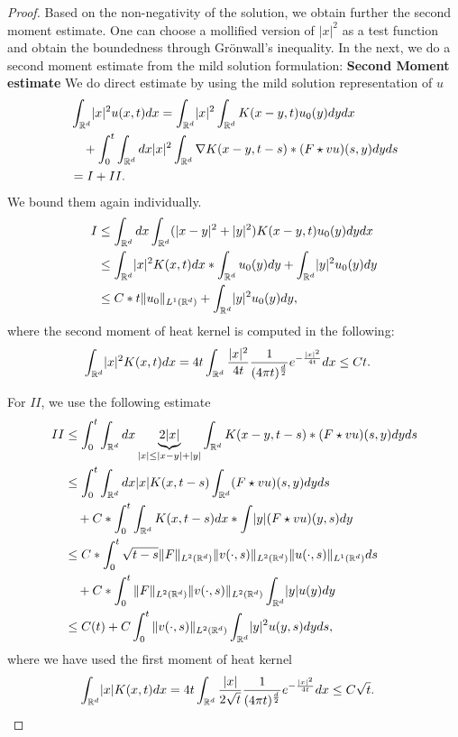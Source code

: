 \begin{proof}
\vskip3mm
Based on the non-negativity of the solution, we obtain further the second moment estimate. One can choose a mollified version of $|x|^2$ as a test function and obtain the boundedness through Grönwall's inequality. In the next, we do a second moment estimate from the mild solution formulation:
{\bf Second Moment estimate}
   We do direct estimate by using the mild solution representation of $u$
   \begin{align*}
   &     \int_{\mathbb{R}^{d} } \lvert x\rvert^2 u(x,t) dx = \int_{\mathbb{R}^{d} } \lvert x\rvert^2   \int_{\mathbb{R}^{d} } K(x-y,t) u_{0}(y) dy dx\\
   &\quad +  \int_0^{t} \int_{\mathbb{R}^{d} } dx \lvert x\rvert^2  \int_{\mathbb{R}^{d} } \nabla K(x-y,t-s) *(F \star  v  u)(s,y) dy ds \\
   &= I + II
   .\end{align*} 
   We bound them again individually.
   \begin{align*}
   I &\le \int_{\mathbb{R}^{d} } dx \int_{\mathbb{R}^{d} } (\lvert x-y\rvert^2+\lvert y\rvert^2) K(x-y,t)  u_{0} (y) dy dx\\
   &\le \int_{\mathbb{R}^{d} } \lvert x\rvert^2K(x,t) dx * \int_{\mathbb{R}^d} u_{0} (y) dy  +  \int_{\mathbb{R}^{d} }  \lvert y\rvert^2 u_0(y) dy\\
   &\le  C*t   \|u_0\|_{L^{1}(\mathbb{R}^d) } + \int_{\mathbb{R}^d} \lvert y\rvert^2 u_0(y) dy
   ,\end{align*}
   where the second moment of heat kernel is computed in the following: 
   \begin{align*}
   \int_{\mathbb{R}^d} \lvert x\rvert^2 K(x,t) dx &=  4t\int_{\mathbb{R}^d} \frac{\lvert x\rvert^2}{4t} \frac{1}{(4\pi t)^{\frac{d}{2}} } e^{-\frac{\lvert x\rvert^2}{4t}}  dx\leq  Ct 
   .\end{align*}
     
   For $II$, we use the following estimate
   \begin{align*}
   II &\leq \int_0^{t} \int_{\mathbb{R}^{d} }  dx \underbrace{2|x|}_{\lvert x\rvert \le \lvert x-y\rvert + \lvert y\rvert} \int_{\mathbb{R}^{d} } K(x-y,t-s)  *(F \star  v  u)(s,y)  dy ds\\
   &\leq \int_0^{t} \int_{\mathbb{R}^{d} }  dx |x| K(x,t-s) \int_{\mathbb{R}^{d} } (F \star  vu)(s,y)  dy ds\\
   &\quad + C * \int_0^{t}  \int_{\mathbb{R}^{d} }K(x,t-s) dx * \int \lvert y\rvert (F \star  vu)(y,s) dy\\
   &\le C*\int_0^{t} \sqrt{t-s} \|F\|_{L^2(\mathbb{R}^d)} \| v (\cdot,s)\|_{L^{2}(\mathbb{R}^d) } \| u (\cdot,s)\|_{L^{1}(\mathbb{R}^d) }   ds \\
   &\quad  + C * \int_0^{t}  \|F\|_{L^2(\mathbb{R}^d)} \| v (\cdot,s)\|_{L^{2}(\mathbb{R}^d) } \int_{\mathbb{R}^{d} } \lvert y\rvert  u (y) dy\\
   &\le C(t) + C \int_0^{t}  \| v (\cdot,s)\|_{L^{2}(\mathbb{R}^d) } \int_{\mathbb{R}^{d} } \lvert y\rvert^2 u (y,s) dy ds
   ,\end{align*}
   where we have used the first moment of heat kernel
   \begin{align*}
   \int_{\mathbb{R}^d} \lvert x\rvert K(x,t) dx &=  4t\int_{\mathbb{R}^d} \frac{\lvert x\rvert}{2\sqrt{t}} \frac{1}{(4\pi t)^{\frac{d}{2}} } e^{-\frac{\lvert x\rvert^2}{4t}}  dx\leq  C\sqrt{t}.
   \end{align*}
   

\end{proof}
